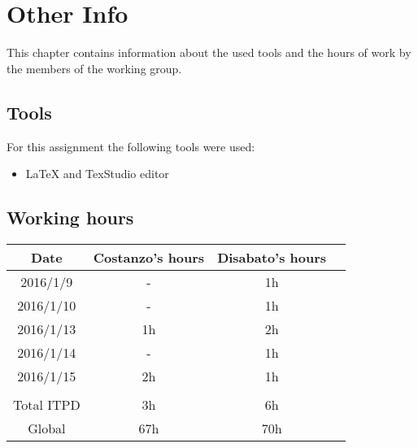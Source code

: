 \documentclass[\mainpath/main]{subfiles}
\begin{document}
\chapter{Other Info}
\label{OtherInfo}

\setmyfancystyle

This chapter contains information about the used tools and the hours of work by the members of the working group.

\section{Tools}
For this assignment the following tools were used:
\begin{itemize}
	\item \LaTeX{} and TexStudio editor
\end{itemize}

\section{Working hours}
\begin{table}[h!]
	\centering
\begin{tabular}{cccc}
\hline
Date     	& Costanzo's hours & Disabato's hours  & \\ \hline
2016/1/9 	& -			  	   & 1h 			   & \\ \hline
2016/1/10	& - 		  	   & 1h 			   & \\ \hline
2016/1/13	& 1h 		  	   & 2h 			   & \\ \hline
2016/1/14 	& - 		  	   & 1h 			   & \\ \hline
2016/1/15 	& 2h 		 	   & 1h 			   & \\ \hline

\\
Total ITPD  & 3h 		 	   & 6h 			   & \\ \hline
Global 	    & 67h 		 	   & 70h 			   & \\ \hline

\end{tabular}
\end{table}
\end{document}
